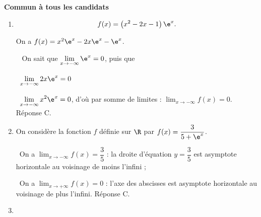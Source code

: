
\textbf{Commun à tous les candidats}

\medskip

%

%

\begin{enumerate}
\item %

\[f(x) = \left(x^2 - 2x - 1\right)\e^x.\]

%
%
On a $f(x) = x^2\e^x - 2x\e^x - \e^x$.

\starredbullet~ On sait que $\displaystyle\lim_{x \to - \infty} \e^x = 0$, puis que 

\starredbullet~$\displaystyle\lim_{x \to - \infty} 2x\e^x = 0$

\starredbullet~$\displaystyle\lim_{x \to - \infty} x^2\e^x = 0$, d'où par somme de limites : $\displaystyle\lim_{x \to - \infty} f(x) = 0$. Réponse C.
\item  On considère la fonction $f$ définie sur $\R$ par $f(x) = \dfrac{3}{5 + \e^x}$.

%
%
%

\starredbullet~On a $\displaystyle\lim_{x \to - \infty} f(x) = \dfrac{3}{5}$ : la droite d'équation $y = \dfrac{3}{5}$ est asymptote horizontale au voisinage de moins l'infini ;

\starredbullet~On a $\displaystyle\lim_{x \to + \infty} f(x) = 0$ : l'axe des abscisses est asymptote horizontale au voisinage de plus l'infini. Réponse C.
\item  %


\end{enumerate}

